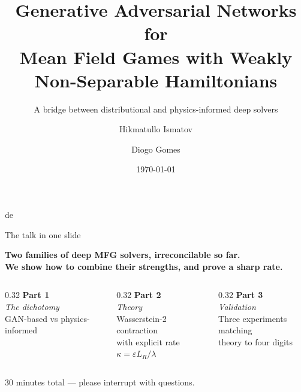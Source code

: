 \documentclass[10pt,aspectratio=169]{beamer}
\title{Generative Adversarial Networks for\\Mean Field Games with Weakly\\Non-Separable Hamiltonians}
\subtitle{A bridge between distributional and physics-informed deep solvers}
\author{Hikmatullo Ismatov \and Diogo Gomes}
\institute{King Abdullah University of Science and Technology}
\date{\today}
\newcommand{\eps}{\varepsilon}
\newcommand{\teal}[1]{\textcolor{kaustteal}{#1}}
\begin{document}
\begin{frame}[plain]
  \maketitle
de\end{frame}


\begin{frame}{The talk in one slide}
\begin{tcolorbox}[colback=kaustteal!8, colframe=kaustteal, arc=3pt]
\centering\large
\textbf{Two families of deep MFG solvers, irreconcilable so far.}\\
\textbf{We show how to combine their strengths, and prove a sharp rate.}
\end{tcolorbox}

\vspace{0.4cm}
\begin{columns}[t]
\begin{column}{0.32\textwidth}
\centering
\textcolor{kaustblue}{\large\textbf{Part 1}}\\[2pt]
\emph{The dichotomy} \\[-2pt]
GAN-based vs physics-informed
\end{column}
\begin{column}{0.32\textwidth}
\centering
\textcolor{kaustblue}{\large\textbf{Part 2}}\\[2pt]
\emph{Theory} \\[-2pt]
Wasserstein-2 contraction\\
with explicit rate $\kappa = \eps L_R/\lambda$
\end{column}
\begin{column}{0.32\textwidth}
\centering
\textcolor{kaustblue}{\large\textbf{Part 3}}\\[2pt]
\emph{Validation} \\[-2pt]
Three experiments matching\\theory to four digits
\end{column}
\end{columns}

\vspace{0.4cm}
\begin{center}
\small\teal{30 minutes total — please interrupt with questions.}
\end{center}
\end{frame}
\end{document}
